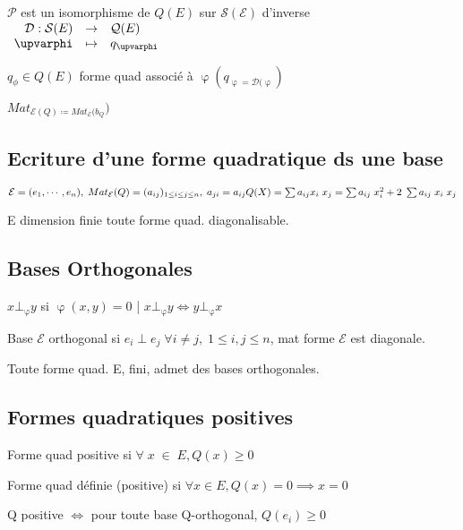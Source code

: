 \documentclass[11pt]{article} %
\begin{document}
\lemme $\mathcal{P}$ est un isomorphisme de $Q(E)$ sur $\mathcal{S(E)}$  d'inverse        $ \\  \begin{array}{rcl}
\mathcal{D} : \mathcal{S}(E)&\to& \mathcal{Q}(E)\\
\upvarphi &\mapsto & q_{\upvarphi}
\end{array} \\ $

 $q_{\phi} \in Q(E) $ forme quad associé à $\upvarphi  ( q_{\upvarphi= \mathcal{D}(\upvarphi})$

\proposition $Mat_{\mathcal{E} (Q) \coloneqq Mat_{\mathcal{E}} (b_Q})$

\subsection{Ecriture d'une forme quadratique ds une base}

 $\mathcal{E}= (e_1, \cdots, e_n) , \; Mat_{\mathcal{E}}(Q)= (a_{ij})_{1 \leq i \leq j \leq n} , \; a_{ji} = a_{ij} \\ Q(X) = \sum a_{ij} x_i \; x_j = \sum a_{ij} \; x_{i}^{2} + 2\; \sum a_{ij} \; x_i \; x_j $

\theoreme E dimension finie toute forme quad. diagonalisable.

\subsection{Bases Orthogonales}

 $ x \bot_{\upvarphi} y $ si $ \upvarphi(x,y)=0$ \; \; \; | $ x \bot_{\upvarphi} y \Longleftrightarrow y \bot_{\upvarphi} x$

 Base $ \mathcal{E} $ orthogonal si $ e_i \; \bot \; e_j \; \forall i \neq j, \; 1 \leq i,j \leq n$,  mat forme $ \mathcal{E}$ est diagonale.

\corollaire Toute forme quad. E, fini, admet des bases orthogonales.

\subsection{Formes quadratiques positives}

 Forme quad positive si $ \forall \; x \; \in \; E, Q(x) \geq 0$

 Forme quad définie (positive) si $ \forall x \in E, Q(x) =0 \implies x=0$

\proposition Q positive $ \Longleftrightarrow$ pour toute base Q-orthogonal, $ Q(e_i) \geq 0$
\end{document}
